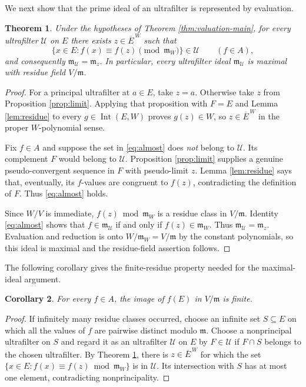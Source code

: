 \documentclass[11pt]{amsart}
\newtheorem{theorem}{Theorem}[section]
\newtheorem{corollary}[theorem]{Corollary}
\theoremstyle{definition}
\theoremstyle{remark}
\newcommand{\Int}{\operatorname{Int}}
\newcommand{\m}{\mathfrak m}
\newcommand{\U}{\mathcal U}
\newcommand{\barE}{\overline E^{\,W}}
\begin{document}
We next show that the prime ideal of an ultrafilter is represented by evaluation.
\begin{theorem}\label{thm:ultra}
Under the hypotheses of Theorem \ref{thm:valuation-main}, for \emph{every} ultrafilter $\U$ on $E$ there exists $z\in\barE$ such that
\[
 \{x\in E:f(x)\equiv f(z)\pmod{\m_W}\}\in\U
 \qquad (f\in A),
 \tag{5.4}\label{eq:almost}
\]
and consequently $\m_{\U}=\m_z$. In particular, every ultrafilter ideal $\m_{\U}$ is maximal with residue field $V/\m$.
\end{theorem}
\begin{proof}
For a principal ultrafilter at $a\in E$, take $z=a$. Otherwise take $z$ from Proposition \ref{prop:limit}. Applying that proposition with $F=E$ and Lemma \ref{lem:residue} to every $g\in\Int(E,W)$ proves $g(z)\in W$, so $z\in\barE$ in the proper $W$-polynomial sense.

Fix $f\in A$ and suppose the set in \eqref{eq:almost} does \emph{not} belong to $\U$. Its complement $F$ would belong to $\U$. Proposition \ref{prop:limit} supplies a genuine pseudo-convergent sequence in $F$ with pseudo-limit $z$. Lemma \ref{lem:residue} says that, eventually, its $f$-values are congruent to $f(z)$, contradicting the definition of $F$. Thus \eqref{eq:almost} holds.

Since $W/V$ is immediate, $f(z)\bmod\m_W$ is a residue class in $V/\m$. Identity \eqref{eq:almost} shows that $f\in\m_{\U}$ if and only if $f(z)\in\m_W$. Thus $\m_{\U}=\m_z$. Evaluation and reduction is onto $W/\m_W=V/\m$ by the constant polynomials, so this ideal is maximal and the residue-field assertion follows.
\end{proof}


The following corollary gives the finite-residue property needed for the maximal-ideal argument.
\begin{corollary}\label{cor:finite}
For every $f\in A$, the image of $f(E)$ in $V/\m$ is finite.
\end{corollary}
\begin{proof}
If infinitely many residue classes occurred, choose an infinite set $S\subseteq E$ on which all the values of $f$ are pairwise distinct modulo $\m$. Choose a nonprincipal ultrafilter on $S$ and regard it as an ultrafilter $\U$ on $E$ by $F\in\U$ if $F\cap S$ belongs to the chosen ultrafilter. By Theorem \ref{thm:ultra}, there is $z\in\barE$ for which the set $\{x\in E:f(x)\equiv f(z)\bmod\m_W\}$ is in $\U$. Its intersection with $S$ has at most one element, contradicting nonprincipality.
\end{proof}
\end{document}
